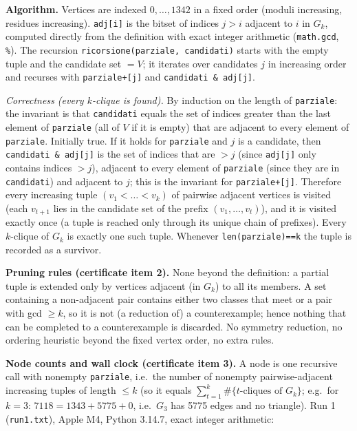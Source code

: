 \textbf{Algorithm.} Vertices are indexed \(0,\dots,1342\) in a fixed
order (moduli increasing, residues increasing). \texttt{adj{[}i{]}} is
the bitset of indices \(j>i\) adjacent to \(i\) in \(G_k\), computed
directly from the definition with exact integer arithmetic
(\texttt{math.gcd}, \texttt{\%}). The recursion
\texttt{ricorsione(parziale,\ candidati)} starts with the empty tuple
and the candidate set \(=V\); it iterates over candidates \(j\) in
increasing order and recurses with \texttt{parziale+{[}j{]}} and
\texttt{candidati\ \&\ adj{[}j{]}}.

\emph{Correctness (every \(k\)-clique is found).} By induction on the
length of \texttt{parziale}: the invariant is that \texttt{candidati}
equals the set of indices greater than the last element of
\texttt{parziale} (all of \(V\) if it is empty) that are adjacent to
every element of \texttt{parziale}. Initially true. If it holds for
\texttt{parziale} and \(j\) is a candidate, then
\texttt{candidati\ \&\ adj{[}j{]}} is the set of indices that are \(>j\)
(since \texttt{adj{[}j{]}} only contains indices \(>j\)), adjacent to
every element of \texttt{parziale} (since they are in
\texttt{candidati}) and adjacent to \(j\); this is the invariant for
\texttt{parziale+{[}j{]}}. Therefore every increasing tuple
\((v_1<\dots<v_k)\) of pairwise adjacent vertices is visited (each
\(v_{t+1}\) lies in the candidate set of the prefix
\((v_1,\dots,v_t)\)), and it is visited exactly once (a tuple is reached
only through its unique chain of prefixes). Every \(k\)-clique of
\(G_k\) is exactly one such tuple. Whenever \texttt{len(parziale)==k}
the tuple is recorded as a survivor.

\textbf{Pruning rules (certificate item 2).} None beyond the definition:
a partial tuple is extended only by vertices adjacent (in \(G_k\)) to
all its members. A set containing a non-adjacent pair contains either
two classes that meet or a pair with gcd \(\ge k\), so it is not (a
reduction of) a counterexample; hence nothing that can be completed to a
counterexample is discarded. No symmetry reduction, no ordering
heuristic beyond the fixed vertex order, no extra rules.

\textbf{Node counts and wall clock (certificate item 3).} A node is one
recursive call with nonempty \texttt{parziale}, i.e.~the number of
nonempty pairwise-adjacent increasing tuples of length \(\le k\) (so it
equals \(\sum_{t=1}^{k}\#\{t\text{-cliques of }G_k\}\); e.g.~for
\(k=3\): \(7118 = 1343 + 5775 + 0\), i.e.~\(G_3\) has 5775 edges and no
triangle). Run 1 (\texttt{run1.txt}), Apple M4, Python 3.14.7, exact
integer arithmetic:

